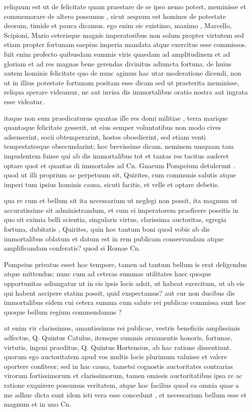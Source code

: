  reliquum est ut de felicitate quam praestare de se ipso nemo potest, meminisse et commemorare de altero possumus , sicut aequum est homines de potestate deorum, timide et pauca dicamus. ego enim sic existimo, maximo , Marcello, Scipioni, Mario ceterisque magnis imperatoribus non solum propter virtutem sed etiam propter fortunam saepius imperia mandata atque exercitus esse commissos. fuit enim profecto quibusdam summis viris quaedam ad amplitudinem et ad gloriam et ad res magnas bene gerendas divinitus adiuncta fortuna. de huius autem hominis felicitate quo de nunc agimus hac utar moderatione dicendi, non ut in illius potestate fortunam positam esse dicam sed ut praeterita meminisse, reliqua sperare videamur, ne aut invisa dis immortalibus oratio nostra aut ingrata esse videatur.

 itaque non sum praedicaturus quantas ille res domi militiae , terra marique quantaque felicitate gesserit, ut eius semper voluntatibus non modo cives adsenserint, socii obtemperarint, hostes oboedierint, sed etiam venti tempestatesque obsecundarint; hoc brevissime dicam, neminem umquam tam impudentem fuisse qui ab dis immortalibus tot et tantas res tacitus auderet optare quot et quantas di immortales ad Cn. Gnaeum Pompeium detulerunt . quod ut illi proprium ac perpetuum sit, Quirites, cum communis salutis atque imperi tum ipsius hominis causa, sicuti facitis, et velle et optare debetis.

 qua re cum et bellum sit ita necessarium ut neglegi non possit, ita magnum ut accuratissime sit administrandum, et cum ei imperatorem praeficere possitis in quo sit eximia belli scientia, singularis virtus, clarissima auctoritas, egregia fortuna, dubitatis , Quirites, quin hoc tantum boni quod vobis ab dis immortalibus oblatum et datum est in rem publicam conservandam atque amplificandam conferatis? quod si Romae Cn.

 Pompeius privatus esset hoc tempore, tamen ad tantum bellum is erat deligendus atque mittendus; nunc cum ad ceteras summas utilitates haec quoque opportunitas adiungatur ut in eis ipsis locis adsit, ut habeat exercitum, ut ab eis qui habent accipere statim possit, quid exspectamus? aut cur non ducibus dis immortalibus eidem cui cetera summa cum salute rei publicae commissa sunt hoc quoque bellum regium commendamus ?

 at enim vir clarissimus, amantissimus rei publicae, vestris beneficiis amplissimis adfectus, Q. Quintus Catulus, itemque summis ornamentis honoris, fortunae, virtutis, ingeni praeditus, Q. Quintus Hortensius, ab hac ratione dissentiunt. quorum ego auctoritatem apud vos multis locis plurimum valuisse et valere oportere confiteor; sed in hac causa, tametsi cognostis auctoritates contrarias virorum fortissimorum et clarissimorum, tamen omissis auctoritatibus ipsa re ac ratione exquirere possumus veritatem, atque hoc facilius quod ea omnia quae a me adhuc dicta sunt idem isti vera esse concedunt , et necessarium bellum esse et magnum et in uno Cn.

